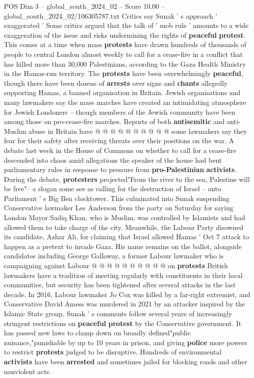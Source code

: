 \begin{textsample}{POS Dim 3 – global\_south\_2024\_02 – Score 10.00 – global\_south\_2024\_02/106305787.txt}
Critics say Sunak ' s approach ' exaggerated ' Some critics argued that the talk of ' mob rule ' amounts to a wide exaggeration of the issue and risks undermining the rights of \textbf{peaceful} \textbf{protest}.
This comes at a time when mass \textbf{protests} have drawn hundreds of thousands of people to central London almost weekly to call for a cease-fire in a conflict that has killed more than 30,000 Palestinians, according to the Gaza Health Ministry in the Hamas-run territory.
The \textbf{protests} have been overwhelmingly \textbf{peaceful}, though there have been dozens of \textbf{arrests} over signs and \textbf{chants} allegedly supporting Hamas, a banned organisation in Britain.
Jewish organisations and many lawmakers say the mass marches have created an intimidating atmosphere for Jewish Londoners -- though members of the Jewish community have been among those on pro-cease-fire marches.
Reports of both \textbf{antisemitic} and anti-Muslim abuse in Britain have @ @ @ @ @ @ @ @ @ @ some lawmakers say they fear for their safety after receiving threats over their positions on the war.
A debate last week in the House of Commons on whether to call for a cease-fire descended into chaos amid allegations the speaker of the house had bent parliamentary rules in response to pressure from \textbf{pro-Palestinian} \textbf{activists}.
During the debate, \textbf{protesters} projected"From the river to the sea, Palestine will be free"-- a slogan some see as calling for the destruction of Israel -- onto Parliament ' s Big Ben clocktower.
This culminated into Sunak suspending Conservative lawmaker Lee Anderson from the party on Saturday for saying London Mayor Sadiq Khan, who is Muslim, was controlled by Islamists and had allowed them to take charge of the city.
Meanwhile, the Labour Party disowned its candidate, Azhar Ali, for claiming that Israel allowed Hamas ' Oct 7 attack to happen as a pretext to invade Gaza.
His name remains on the ballot, alongside candidates including George Galloway, a former Labour lawmaker who is campaigning against Labour @ @ @ @ @ @ @ @ @ @ on \textbf{protests} British lawmakers have a tradition of meeting regularly with constituents in their local communities, but security has been tightened after several attacks in the last decade.
In 2016, Labour lawmaker Jo Cox was killed by a far-right extremist, and Conservative David Amess was murdered in 2021 by an attacker inspired by the Islamic State group.
Sunak ' s comments follow several years of increasingly stringent restrictions on \textbf{peaceful} \textbf{protest} by the Conservative government.
It has passed new laws to clamp down on broadly defined"public nuisance,"punishable by up to 10 years in prison, and giving \textbf{police} more powers to restrict \textbf{protests} judged to be disruptive.
Hundreds of environmental \textbf{activists} have been \textbf{arrested} and sometimes jailed for blocking roads and other nonviolent acts.

\end{textsample}

